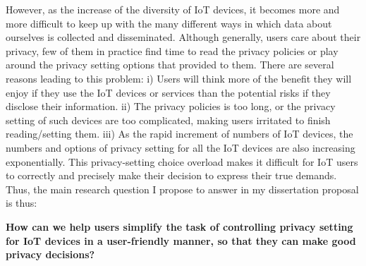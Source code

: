 However, as the increase of the diversity of IoT devices, it becomes more and more difficult to keep up with the many different ways in which data about ourselves is collected and disseminated. Although generally, users care about their privacy, few of them in practice find time to read the privacy policies or play around the privacy setting options that provided to them. There are several reasons leading to this problem: i) Users will think more of the benefit they will enjoy if they use the IoT devices or services than the potential risks if they disclose their information. ii) The privacy policies is too long, or the privacy setting of such devices are too complicated, making users irritated to finish reading/setting them. iii) As the rapid increment of numbers of IoT devices, the numbers and options of privacy setting for all the IoT devices are also increasing exponentially. This privacy-setting choice overload makes it difficult for IoT users to correctly and precisely make their decision to express their true demands. Thus, the main research question I propose to answer in my dissertation proposal is thus:

\textbf{How can we help users simplify the task of controlling privacy setting for IoT devices in a user-friendly manner, so that they can make good privacy decisions?}